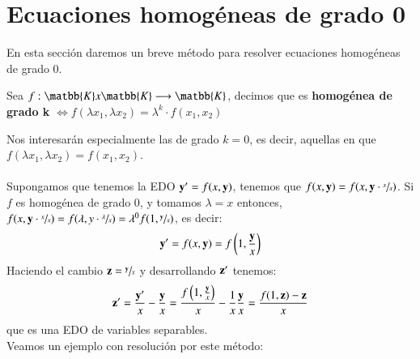 \section{Ecuaciones homogéneas de grado 0}
En esta sección daremos un breve método para resolver ecuaciones homogéneas de grado $0$.
\begin{dfn}
    Sea $f: \matbb{K} x \matbb{K} \longrightarrow \matbb{K}$, decimos que es \textbf{homogénea de grado k} $\iff f(\lambda x_1, \lambda x_2) = \lambda^k \cdot f(x_1, x_2)$
\end{dfn}
Nos interesarán especialmente las de grado $k=0$, es decir, aquellas en que $f(\lambda x_1, \lambda x_2) = f(x_1, x_2)$.\\\\
Supongamos que tenemos la EDO $\mathbf{y'} = f(x, \mathbf{y})$, tenemos que $f(x, \mathbf{y}) = f(x, \mathbf{y} \cdot \sfrac{x}{x})$. Si $f$ es homogénea de grado 0, y tomamos $\lambda = x$ entonces, $f(x, \mathbf{y} \cdot \sfrac{x}{x}) = f(\lambda, y \cdot \sfrac{\lambda}{x}) = \lambda^0 f(1, \sfrac{\mathbf{y}}{x})$, es decir:
$$
    \mathbf{y}' = f(x,\mathbf{y}) = f\left(1, \frac{\mathbf{y}}{x}\right)
$$
Haciendo el cambio $\mathbf{z} = \sfrac{\mathbf{y}}{x}$ y desarrollando $\mathbf{z'}$ tenemos:
$$
    \mathbf{z'} = \frac{\mathbf{y'}}{x} - \frac{\mathbf{y}}{x} = \frac{f\left(1,\frac{\mathbf{y}}{x}\right)}{x} - \frac{1}{x} \frac{\mathbf{y}}{x} = \frac{f(1,\mathbf{z}) - \mathbf{z}}{x}
$$
que es una EDO de variables separables.\\Veamos un ejemplo con resolución por este método:
